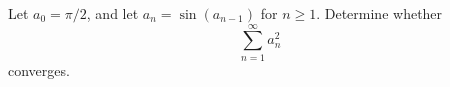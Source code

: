Let $a_0 = \pi/2$, and let $a_n = \sin(a_{n-1})$ for $n \geq 1$. Determine whether
\[
\sum_{n=1}^\infty a_n^2
\]
converges.
